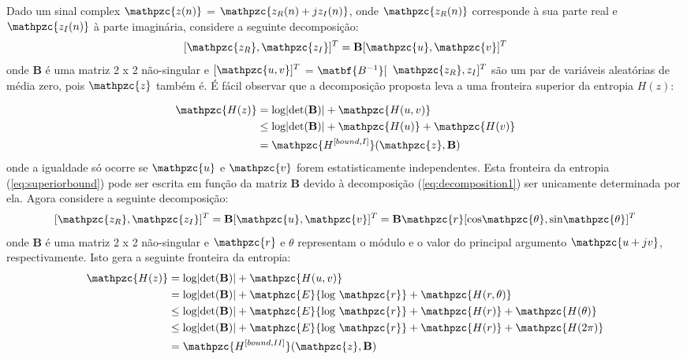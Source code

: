     Dado um sinal complex $\mathpzc{z(n)}$ = $\mathpzc{z_R(n) + jz_I(n)}$, onde $\mathpzc{z_R(n)}$ corresponde à sua parte real e $\mathpzc{z_I(n)}$ à parte imaginária, considere a seguinte decomposição:
    \begin{equation}
        \label{eq:decomposition1}
            [\mathpzc{z_R}, \mathpzc{z_I}]^T =
            \mathbf{B}[\mathpzc{u},\mathpzc{v}]^T
    \end{equation}
    onde $\mathbf{B}$ é uma matriz 2 x 2 não-singular e $[\mathpzc{u,v}]^T$ = $\matbf{B^{-1}}[$ $\mathpzc{z_R},{z_I}]^T$ são um par de variáveis aleatórias de média zero, pois $\mathpzc{z}$ também é. É fácil observar que a decomposição proposta leva a uma fronteira superior da entropia ${H(z)}$\cite{entropy}:
        
    \begin{equation}\label{eq:superiorbound}
        \begin{split}
            \mathpzc{H(z)} & =\text{log}|\text{det}(\mathbf{B})| + \mathpzc{H(u,v)} \\
                          & \leq \text{log}|\text{det}(\mathbf{B})| + \mathpzc{H(u)} + \mathpzc{H(v)} \\
                          & = \mathpzc{H^{[bound,I]}}(\mathpzc{z},\mathbf{B})
        \end{split}
    \end{equation}
    onde a igualdade só ocorre se $\mathpzc{u}$ e $\mathpzc{v}$ forem estatisticamente independentes. Esta fronteira da entropia (\ref{eq:superiorbound}) pode ser escrita em função da matriz $\mathbf{B}$ devido à decomposição (\ref{eq:decomposition1}) ser unicamente determinada por ela.
    Agora considere a seguinte decomposição:
    \begin{equation}
        \label{eq:decomposition2}
            [\mathpzc{z_R}, \mathpzc{z_I}]^T =
            \mathbf{B}[\mathpzc{u},\mathpzc{v}]^T = \mathbf{B}\mathpzc{r}[\text{cos}\mathpzc{\theta},\text{sin}\mathpzc{\theta}]^T  
    \end{equation}
    onde $\mathbf{B}$ é uma matriz 2 x 2 não-singular e $\mathpzc{r}$ e $\theta$ representam o módulo e o valor do principal argumento $\mathpzc{u + jv}$, respectivamente. Isto gera a seguinte fronteira da entropia:
    \begin{equation}\label{eq:inferiorbound}
        \begin{split}
            \mathpzc{H(z)} & =\text{log}|\text{det}(\mathbf{B})| + \mathpzc{H(u,v)} \\
                          &  = \text{log}|\text{det}(\mathbf{B})| + \matphzc{E}\{\text{log } \mathpzc{r}\} + \mathpzc{H(r,\theta)} \\
                          & \leq \text{log}|\text{det}(\mathbf{B})| + \matphzc{E}\{\text{log } \mathpzc{r}\} + \mathpzc{H(r)} + \mathpzc{H(\theta)} \\
                          & \leq \text{log}|\text{det}(\mathbf{B})| + \matphzc{E}\{\text{log } \mathpzc{r}\} + \mathpzc{H(r)} + \mathpzc{H(2\pi)} \\
                          & = \mathpzc{H^{[bound,II]}}(\mathpzc{z},\mathbf{B})
            \end{split}
    \end{equation}
